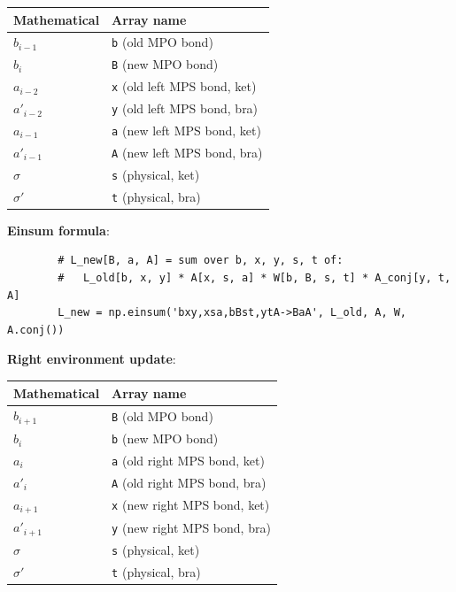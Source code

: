 \documentclass[aps,prb,onecolumn,scriptaddress]{revtex4-2}
\begin{document}
	\begin{center}
		\begin{tabular}{ll}
			\toprule
			\textbf{Mathematical} & \textbf{Array name} \\
			\midrule
			$b_{i-1}$ & \texttt{b} (old MPO bond) \\
			$b_i$ & \texttt{B} (new MPO bond) \\
			$a_{i-2}$ & \texttt{x} (old left MPS bond, ket) \\
			$a'_{i-2}$ & \texttt{y} (old left MPS bond, bra) \\
			$a_{i-1}$ & \texttt{a} (new left MPS bond, ket) \\
			$a'_{i-1}$ & \texttt{A} (new left MPS bond, bra) \\
			$\sigma$ & \texttt{s} (physical, ket) \\
			$\sigma'$ & \texttt{t} (physical, bra) \\
			\bottomrule
		\end{tabular}
	\end{center}
	
	\textbf{Einsum formula}:
	\begin{verbatim}
		# L_new[B, a, A] = sum over b, x, y, s, t of:
		#   L_old[b, x, y] * A[x, s, a] * W[b, B, s, t] * A_conj[y, t, A]
		L_new = np.einsum('bxy,xsa,bBst,ytA->BaA', L_old, A, W, A.conj())
	\end{verbatim}
	
	\textbf{Right environment update}:
	
	\begin{center}
		\begin{tabular}{ll}
			\toprule
			\textbf{Mathematical} & \textbf{Array name} \\
			\midrule
			$b_{i+1}$ & \texttt{B} (old MPO bond) \\
			$b_i$ & \texttt{b} (new MPO bond) \\
			$a_i$ & \texttt{a} (old right MPS bond, ket) \\
			$a'_i$ & \texttt{A} (old right MPS bond, bra) \\
			$a_{i+1}$ & \texttt{x} (new right MPS bond, ket) \\
			$a'_{i+1}$ & \texttt{y} (new right MPS bond, bra) \\
			$\sigma$ & \texttt{s} (physical, ket) \\
			$\sigma'$ & \texttt{t} (physical, bra) \\
			\bottomrule
		\end{tabular}
	\end{center}
	
\end{document}

